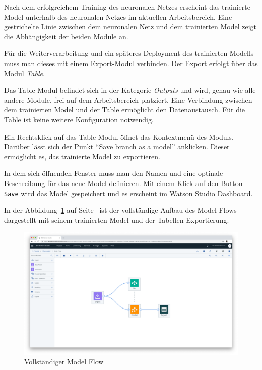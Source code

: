 Nach dem erfolgreichem Training des neuronalen Netzes erscheint das trainierte Model unterhalb des neuronalen Netzes im
aktuellen Arbeitsbereich. Eine gestrichelte Linie zwischen dem neuronalen Netz und dem trainierten Model zeigt die
Abhängigkeit der beiden Module an.

Für die Weiterverarbeitung und ein späteres Deployment des trainierten Modells muss man dieses mit einem Export-Modul
verbinden. Der Export erfolgt über das Modul \textit{Table}.

Das Table-Modul befindet sich in der Kategorie \textit{Outputs} und wird, genau wie alle andere Module, frei auf dem
Arbeitsbereich platziert. Eine Verbindung zwischen dem trainierten Model und der Table ermöglicht den Datenaustausch.
Für die Table ist keine weitere Konfiguration notwendig.

Ein Rechtsklick auf das Table-Modul öffnet das Kontextmenü des Moduls. Darüber lässt sich der Punkt
\enquote{Save branch as a model} anklicken. Dieser ermöglicht es, das trainierte Model zu exportieren.

In dem sich öffnenden Fenster muss man den Namen und eine optinale Beschreibung für das neue Model definieren. Mit einem
Klick auf den Button \texttt{Save} wird das Model gespeichert und es erscheint im Watson Studio Dashboard.

In der Abbildung~\ref{fig:umsetzung_model_flow} auf Seite~\pageref{fig:umsetzung_model_flow} ist der vollständige Aufbau
des Model Flows dargestellt mit seinem trainierten Model und der Tabellen-Exportierung.

\begin{figure}[h]
    \centering
    \includegraphics[width=\textwidth]{images/kapitel_3/umsetzung_model_flow.png}
    \caption{Vollständiger Model Flow}
    \label{fig:umsetzung_model_flow}
\end{figure}

